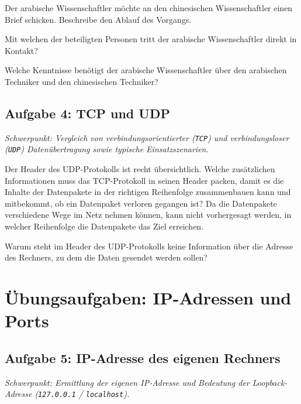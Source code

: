 \begin{compactenum}[a)]
\item Der arabische Wissenschaftler möchte an den chinesischen Wissenschaftler
einen Brief schicken. Beschreibe den Ablauf des Vorgangs.
\item Mit welchen der beteiligten Personen tritt der arabische Wissenschaftler
direkt in Kontakt?
\item Welche Kenntnisse benötigt der arabische Wissenschaftler über den
arabischen Techniker und den chinesischen Techniker?
\end{compactenum}


\subsection{Aufgabe 4: TCP und UDP \tagLK \tagGKWahl}
\noindent \emph{Schwerpunkt: Vergleich von verbindungsorientierter (\texttt{TCP}) und verbindungsloser (\texttt{UDP}) Datenübertragung sowie typische Einsatzszenarien.}

\begin{compactenum}[a)]
\item Der Header des UDP-Protokolls ist recht übersichtlich. Welche zusätzlichen
Informationen muss das TCP-Protokoll in seinen Header packen, damit es die
Inhalte der Datenpakete in der richtigen Reihenfolge zusammenbauen kann und
mitbekommt, ob ein Datenpaket verloren gegangen ist? Da die Datenpakete
verschiedene Wege im Netz nehmen können, kann nicht vorhergesagt werden, in
welcher Reihenfolge die Datenpakete das Ziel erreichen.

\item Warum steht im Header des UDP-Protokolls keine Information über die
Adresse des Rechners, zu dem die Daten gesendet werden sollen?
\end{compactenum}


\section{Übungsaufgaben: IP-Adressen und Ports}


\subsection{Aufgabe 5: IP-Adresse des eigenen Rechners \tagLK}
\noindent \emph{Schwerpunkt: Ermittlung der eigenen IP-Adresse und Bedeutung der Loopback-Adresse (\texttt{127.0.0.1} / \texttt{localhost}).}

